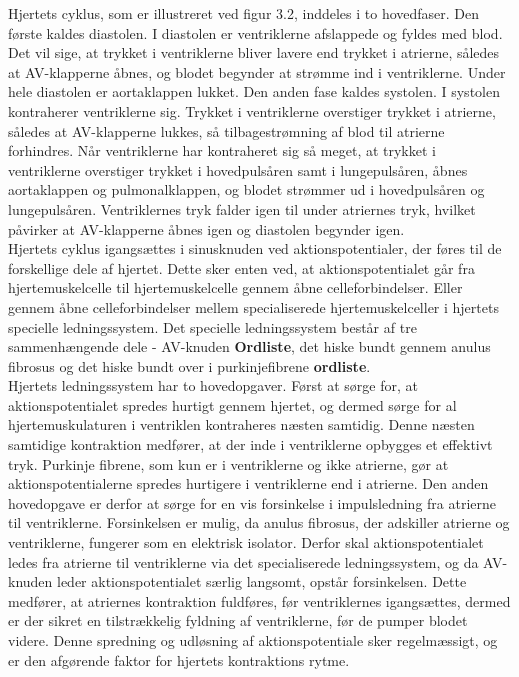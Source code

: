 Hjertets cyklus, som er illustreret ved figur 3.2, inddeles i to hovedfaser. Den første kaldes diastolen. I diastolen er ventriklerne afslappede og fyldes med blod. Det vil sige, at trykket i ventriklerne bliver lavere end trykket i atrierne, således at AV-klapperne åbnes, og blodet begynder at strømme ind i ventriklerne. Under hele diastolen er aortaklappen lukket. Den anden fase kaldes systolen. I systolen kontraherer ventriklerne sig. Trykket i ventriklerne overstiger trykket i atrierne, således at AV-klapperne lukkes, så tilbagestrømning af blod til atrierne forhindres. Når ventriklerne har kontraheret sig så meget, at trykket i ventriklerne overstiger trykket i hovedpulsåren samt i lungepulsåren, åbnes aortaklappen og pulmonalklappen, og blodet strømmer ud i hovedpulsåren og lungepulsåren. Ventriklernes tryk falder igen til under atriernes tryk, hvilket påvirker at AV-klapperne åbnes igen og diastolen begynder igen.\\
Hjertets cyklus igangsættes i sinusknuden ved aktionspotentialer, der føres til de forskellige dele af hjertet. Dette sker enten ved, at aktionspotentialet går fra hjertemuskelcelle til hjertemuskelcelle gennem åbne celleforbindelser. Eller gennem åbne celleforbindelser mellem specialiserede hjertemuskelceller i hjertets specielle ledningssystem. Det specielle ledningssystem består af tre sammenhængende dele - AV-knuden \textbf{ Ordliste}, det hiske bundt gennem anulus fibrosus og det hiske bundt over i purkinjefibrene \textbf{ ordliste}. \\
Hjertets ledningssystem har to hovedopgaver. Først at sørge for, at aktionspotentialet spredes hurtigt gennem hjertet, og dermed sørge for al hjertemuskulaturen i ventriklen kontraheres næsten samtidig. Denne næsten samtidige kontraktion medfører, at der inde i ventriklerne opbygges et effektivt tryk. Purkinje fibrene, som kun er i ventriklerne og ikke atrierne, gør at aktionspotentialerne spredes hurtigere i ventriklerne end i atrierne. Den anden hovedopgave er derfor at sørge for en vis forsinkelse i impulsledning fra atrierne til ventriklerne. Forsinkelsen er mulig, da anulus fibrosus, der adskiller atrierne og ventriklerne, fungerer som en elektrisk isolator. Derfor skal aktionspotentialet ledes fra atrierne til ventriklerne via det specialiserede ledningssystem, og da AV-knuden leder aktionspotentialet særlig langsomt, opstår forsinkelsen. Dette medfører, at atriernes kontraktion fuldføres, før ventriklernes igangsættes, dermed er der sikret en tilstrækkelig fyldning af ventriklerne, før de pumper blodet videre. Denne spredning og udløsning af aktionspotentiale sker regelmæssigt, og er den afgørende faktor for hjertets kontraktions rytme.
